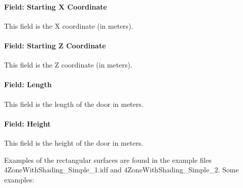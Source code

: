 \paragraph{Field: Starting X Coordinate}\label{field-starting-x-coordinate-15}

This field is the X coordinate (in meters).

\paragraph{Field: Starting Z Coordinate}\label{field-starting-z-coordinate-15}

This field is the Z coordinate (in meters).

\paragraph{Field: Length}\label{field-length-15}

This field is the length of the door in meters.

\paragraph{Field: Height}\label{field-height-9}

This field is the height of the door in meters.

Examples of the rectangular surfaces are found in the example files 4ZoneWithShading\_Simple\_1.idf and 4ZoneWithShading\_Simple\_2. Some examples:

